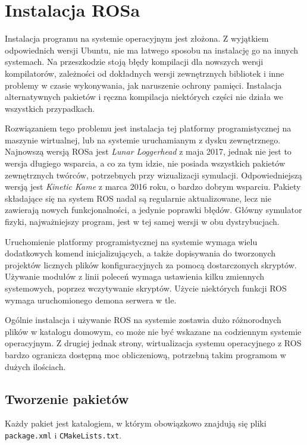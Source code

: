 \section{Instalacja ROSa}
	Instalacja programu na systemie operacyjnym jest złożona.
	Z wyjątkiem odpowiednich wersji Ubuntu, nie ma łatwego sposobu na instalację go na innych systemach.
	Na przeszkodzie stoją błędy kompilacji dla nowszych wersji kompilatorów, zależności od dokładnych wersji zewnętrznych bibliotek i 
	inne problemy w czasie wykonywania, jak naruszenie ochrony pamięci. 
	Instalacja alternatywnych pakietów i ręczna kompilacja niektórych części nie działa we wszystkich przypadkach.

	Rozwiązaniem tego problemu jest instalacja tej platformy programistycznej na maszynie wirtualnej, lub na systemie uruchamianym z dysku zewnętrznego. 
	Najnowszą wersją ROSa jest \emph{Lunar Loggerhead} z maja 2017, jednak nie jest to wersja długiego wsparcia, a co za tym idzie, nie posiada wszystkich
	pakietów zewnętrznych twórców, potrzebnych przy wizualizacji symulacji.
	Odpowiedniejszą wersją jest \emph{Kinetic Kame} z marca 2016 roku, o bardzo dobrym wsparciu.
	Pakiety składające się na system ROS nadal są regularnie aktualizowane, lecz nie zawierają nowych funkcjonalności, a jedynie poprawki błędów.
	Główny symulator fizyki, najważniejszy program, jest w tej samej wersji w obu dystrybucjach.

	Uruchomienie platformy programistycznej na systemie wymaga wielu dodatkowych komend inicjalizujących, 
	a także dopisywania do tworzonych projektów licznych plików konfiguracyjnych za pomocą dostarczonych skryptów.
	Używanie modułów z linii poleceń wymaga ustawienia kilku zmiennych systemowych, poprzez wczytywanie skryptów.
	Użycie niektórych funkcji ROS wymaga uruchomionego demona serwera w tle.

	Ogólnie instalacja i używanie ROS na systemie zostawia dużo różnorodnych plików w katalogu domowym, co może nie być wskazane na codziennym systemie operacyjnym.
	Z drugiej jednak strony, wirtualizacja systemu operacyjnego z ROS bardzo ogranicza dostępną moc obliczeniową, potrzebną takim programom w dużych ilościach.
	
	\subsection{Tworzenie pakietów}
		Każdy pakiet jest katalogiem, w którym obowiązkowo znajdują się pliki \texttt{package.xml} i \texttt{CMakeLists.txt}.
		
